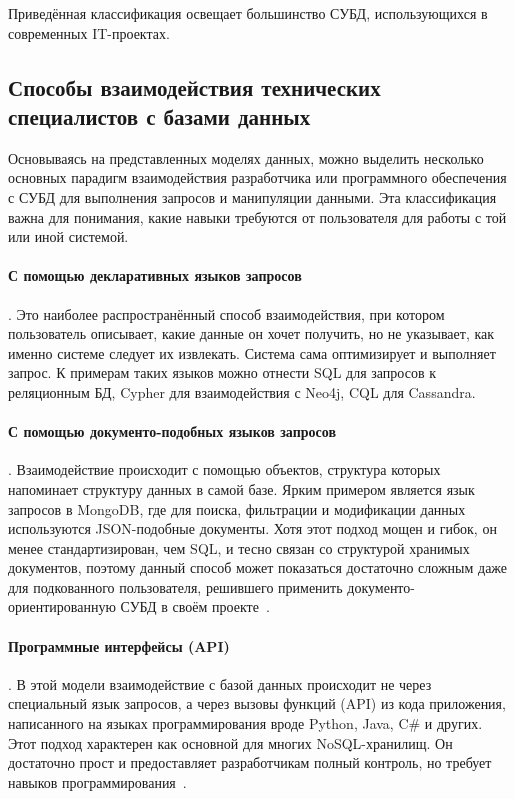 Приведённая классификация освещает большинство СУБД, использующихся в современных IT-проектах.




\subsection{Способы взаимодействия технических специалистов с базами данных}

Основываясь на представленных моделях данных, можно выделить несколько основных парадигм взаимодействия
разработчика или программного обеспечения с СУБД для выполнения запросов и манипуляции данными.
Эта классификация важна для понимания, какие навыки требуются от пользователя для работы с той или иной системой.

\paragraph{С помощью декларативных языков запросов}. Это наиболее распространённый способ взаимодействия,
при котором пользователь описывает, какие данные он хочет получить, но не указывает,
как именно системе следует их извлекать. Система сама оптимизирует и выполняет запрос.
К примерам таких языков можно отнести SQL для запросов к реляционным БД, Cypher для взаимодействия с Neo4j, CQL для Cassandra.

\paragraph{С помощью документо-подобных языков запросов}. Взаимодействие происходит с помощью объектов,
структура которых напоминает структуру данных в самой базе.
Ярким примером является язык запросов в MongoDB, где для поиска, фильтрации и модификации данных
используются JSON-подобные документы. Хотя этот подход мощен и гибок, он менее стандартизирован,
чем SQL, и тесно связан со структурой хранимых документов, поэтому данный способ может показаться достаточно
сложным даже для подкованного пользователя, решившего применить документо-ориентированную СУБД в своём
проекте~\cite{yakushinSravnitelnyyAnalizRelyacionnoy2018}.

\paragraph{Программные интерфейсы (API)}. В этой модели взаимодействие с базой данных происходит
не через специальный язык запросов, а через вызовы функций (API) из кода приложения,
написанного на языках программирования вроде Python, Java, C\# и других.
Этот подход характерен как основной для многих NoSQL-хранилищ.
Он достаточно прост и предоставляет разработчикам полный контроль, но требует навыков
программирования~\cite{yakushinSravnitelnyyAnalizRelyacionnoy2018,
	ivanovObzorSovremennyhNoSQL2019}.

